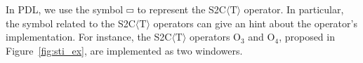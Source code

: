 

\noindent
In PDL, we use the symbol $\hrectangle$ to represent the S2C$\langle\mathrm{T}\rangle$ operator. 
In particular, the symbol related to the S2C$\langle\mathrm{T}\rangle$ operators can give an hint about the operator's implementation.
For instance, the S2C$\langle\mathrm{T}\rangle$ operators O$_3$ and O$_4$, proposed in Figure~\ref{fig:sti_ex}, are implemented as two windowers.

